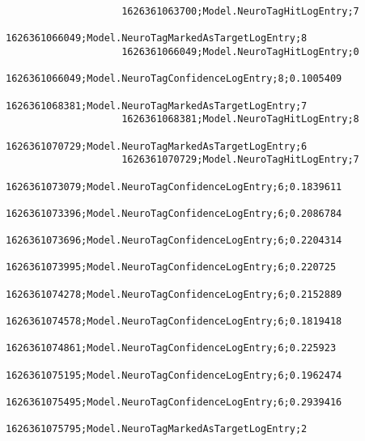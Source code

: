 \begin{lstlisting}
                    1626361063700;Model.NeuroTagHitLogEntry;7
                    1626361066049;Model.NeuroTagMarkedAsTargetLogEntry;8
                    1626361066049;Model.NeuroTagHitLogEntry;0
                    1626361066049;Model.NeuroTagConfidenceLogEntry;8;0.1005409
                    1626361068381;Model.NeuroTagMarkedAsTargetLogEntry;7
                    1626361068381;Model.NeuroTagHitLogEntry;8
                    1626361070729;Model.NeuroTagMarkedAsTargetLogEntry;6
                    1626361070729;Model.NeuroTagHitLogEntry;7
                    1626361073079;Model.NeuroTagConfidenceLogEntry;6;0.1839611
                    1626361073396;Model.NeuroTagConfidenceLogEntry;6;0.2086784
                    1626361073696;Model.NeuroTagConfidenceLogEntry;6;0.2204314
                    1626361073995;Model.NeuroTagConfidenceLogEntry;6;0.220725
                    1626361074278;Model.NeuroTagConfidenceLogEntry;6;0.2152889
                    1626361074578;Model.NeuroTagConfidenceLogEntry;6;0.1819418
                    1626361074861;Model.NeuroTagConfidenceLogEntry;6;0.225923
                    1626361075195;Model.NeuroTagConfidenceLogEntry;6;0.1962474
                    1626361075495;Model.NeuroTagConfidenceLogEntry;6;0.2939416
                    1626361075795;Model.NeuroTagMarkedAsTargetLogEntry;2
                \end{lstlisting}
            

        \listoffigures %
        \listoftables %


     
    

    \clearpage\thispagestyle{empty}
    \eigen  %

